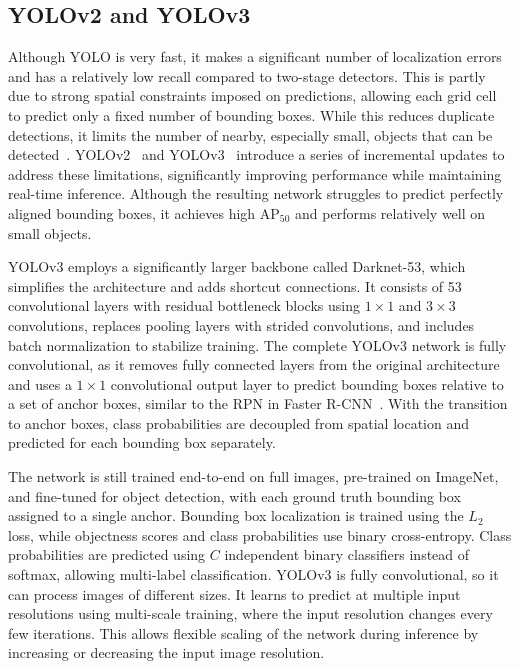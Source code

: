 \subsection{YOLOv2 and YOLOv3}
Although YOLO is very fast, it makes a significant number of localization errors and has a relatively low recall compared to two-stage detectors. This is partly due to strong spatial constraints imposed on predictions, allowing each grid cell to predict only a fixed number of bounding boxes. While this reduces duplicate detections, it limits the number of nearby, especially small, objects that can be detected~\cite{Redmon2016}. YOLOv2~\cite{Redmon2017} and YOLOv3~\cite{Redmon2018} introduce a series of incremental updates to address these limitations, significantly improving performance while maintaining real-time inference. Although the resulting network struggles to predict perfectly aligned bounding boxes, it achieves high $\mathrm{AP}_{50}$ and performs relatively well on small objects.

YOLOv3 employs a significantly larger backbone called Darknet-53, which simplifies the architecture and adds shortcut connections. It consists of 53 convolutional layers with residual bottleneck blocks using $1 \times 1$ and $3 \times 3$ convolutions, replaces pooling layers with strided convolutions, and includes batch normalization to stabilize training. The complete YOLOv3 network is fully convolutional, as it removes fully connected layers from the original architecture and uses a $1 \times 1$ convolutional output layer to predict bounding boxes relative to a set of anchor boxes, similar to the RPN in Faster R-CNN~\cite{Ren2015}. With the transition to anchor boxes, class probabilities are decoupled from spatial location and predicted for each bounding box separately.

The network is still trained end-to-end on full images, pre-trained on ImageNet, and fine-tuned for object detection, with each ground truth bounding box assigned to a single anchor. Bounding box localization is trained using the $L_2$ loss, while objectness scores and class probabilities use binary cross-entropy. Class probabilities are predicted using $C$ independent binary classifiers instead of softmax, allowing multi-label classification. YOLOv3 is fully convolutional, so it can process images of different sizes. It learns to predict at multiple input resolutions using multi-scale training, where the input resolution changes every few iterations. This allows flexible scaling of the network during inference by increasing or decreasing the input image resolution.~\cite{Redmon2017, Redmon2018}

